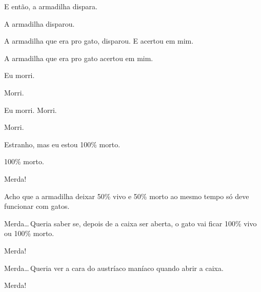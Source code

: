 E então, a armadilha dispara.

A armadilha disparou.

A armadilha que era pro gato, disparou. E acertou em mim.

A armadilha que era pro gato acertou em mim.

Eu morri.

Morri.

Eu morri. Morri.

Morri.

Estranho, mas eu estou 100\% morto.

100\% morto.

Merda!

Acho que a armadilha deixar 50\% vivo e 50\% morto ao mesmo tempo só deve funcionar com gatos.

Merda\ldots\,Queria saber se, depois de a caixa ser aberta, o gato vai ficar 100\% vivo ou 100\% morto.

Merda!

Merda\ldots\,Queria ver a cara do austríaco maníaco quando abrir a caixa.

Merda!
